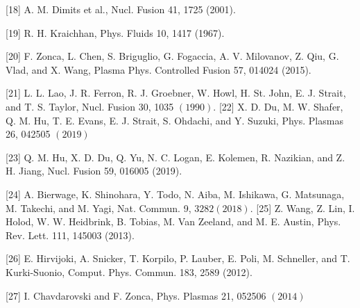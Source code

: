 \documentclass[10pt]{article}
\begin{document}
[18] A. M. Dimits et al., Nucl. Fusion 41, 1725 (2001).

[19] R. H. Kraichhan, Phys. Fluids 10, 1417 (1967).

[20] F. Zonca, L. Chen, S. Briguglio, G. Fogaccia, A. V. Milovanov, Z. Qiu, G. Vlad, and X. Wang, Plasma Phys. Controlled Fusion 57, 014024 (2015).

[21] L. L. Lao, J. R. Ferron, R. J. Groebner, W. Howl, H. St. John, E. J. Strait, and T. S. Taylor, Nucl. Fusion 30, 1035 $(1990)$. [22] X. D. Du, M. W. Shafer, Q. M. Hu, T. E. Evans, E. J. Strait, S. Ohdachi, and Y. Suzuki, Phys. Plasmas 26, 042505 $(2019)$

[23] Q. M. Hu, X. D. Du, Q. Yu, N. C. Logan, E. Kolemen, R. Nazikian, and Z. H. Jiang, Nucl. Fusion 59, 016005 (2019).

[24] A. Bierwage, K. Shinohara, Y. Todo, N. Aiba, M. Ishikawa, G. Matsunaga, M. Takechi, and M. Yagi, Nat. Commun. 9, $3282(2018)$. [25] Z. Wang, Z. Lin, I. Holod, W. W. Heidbrink, B. Tobias, M. Van Zeeland, and M. E. Austin, Phys. Rev. Lett. 111, 145003 (2013).

[26] E. Hirvijoki, A. Snicker, T. Korpilo, P. Lauber, E. Poli, M. Schneller, and T. Kurki-Suonio, Comput. Phys. Commun. 183, 2589 (2012).

[27] I. Chavdarovski and F. Zonca, Phys. Plasmas 21, 052506 $(2014)$
\end{document}
